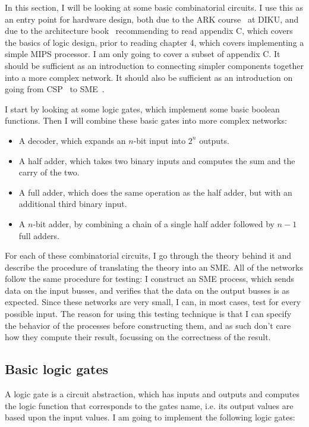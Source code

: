 In this section, I will be looking at some basic combinatorial circuits. I
use this as an entry point for hardware design, both due to the ARK
course~\cite{ref:ark} at DIKU, and due to the architecture
book~\cite{ref:ark-book} recommending to read appendix C, which covers the
basics of logic design, prior to reading chapter 4, which covers implementing a
simple MIPS processor. I am only going to cover a subset of appendix C. It
should be sufficient as an introduction to connecting simpler components
together into a more complex network. It should also be sufficient as an
introduction on going from CSP~\cite{ref:csp} to SME~\cite{ref:sme1,
ref:sme2, ref:sme-cs}.

I start by looking at some logic gates, which implement some basic boolean
functions. Then I will combine these basic gates into more complex networks:
\begin{itemize}
    \item A decoder, which expands an $n$-bit input into $2^n$ outputs.
    \item A half adder, which takes two binary inputs and computes the sum and
        the carry of the two.
    \item A full adder, which does the same operation as the half adder, but
        with an additional third binary input.
    \item A $n$-bit adder, by combining a chain of a single half adder followed
        by $n-1$ full adders.
\end{itemize}

For each of these combinatorial circuits, I go through the theory behind it and
describe the procedure of translating the theory into an SME. All of the
networks follow the same procedure for testing: I construct an SME process,
which sends data on the input busses, and verifies that the data on the output
busses is as expected. Since these networks are very small, I can, in most
cases, test for every possible input. The reason for using this testing
technique is that I can specify the behavior of the processes before
constructing them, and as such don't care how they compute their result,
focussing on the correctness of the result.

\subsection{Basic logic gates}\label{sec:basic}
A logic gate is a circuit abstraction, which has inputs and outputs and
computes the logic function that corresponds to the gates name, i.e. its output
values are based upon the input values. I am going to implement the following
logic gates:

